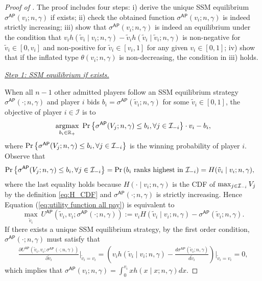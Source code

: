 \begin{proof}[{Proof of }]
The proof includes four steps: i) derive the unique SSM equilibrium $\sigma^{\mathsf{AP}}(v_i;n,\gamma)$ if exists; ii) check the obtained function $\sigma^{\mathsf{AP}}(v_i;n,\gamma)$ is indeed strictly increasing; iii) show that $\sigma^{\mathsf{AP}}(v_i;n,\gamma)$ is indeed an equilibrium under the condition that $v_i h(\tilde{v}_i\mid v_i;n,\gamma) - \tilde{v}_i h(\tilde{v}_i\mid \tilde{v}_i;n,\gamma)$ is non-negative for $\tilde{v}_i\in [0,v_i]$ and non-positive for $\tilde{v}_i\in [v_i,1]$ for any given $v_i\in [0,1]$; iv) show that if the inflated type
$\theta\left(v_i; n, \gamma\right)$ is non-decreasing, the condition in iii) holds.

 \medskip

\noindent\textit{\underline{Step 1: SSM equilibrium if exists.}}

 \medskip

\noindent When all $n-1$ other admitted players follow an SSM equilibrium strategy $\sigma^{\mathsf{AP}}(\cdot;n,\gamma)$ and player $i$ bids $ b_i =  \sigma^{\mathsf{AP}}(\tilde{v}_i;n,\gamma)$ for some $\tilde{v}_i\in[0,1]$, the objective of player $i \in \mathcal{I}$ is to
\begin{align}\label{eq:utility function all pay}
    \operatorname*{\text{argmax}}_{b_i\in \mathbb{R}_+}~  \Pr\left\{\sigma^{\mathsf{AP}}({V}_j;n,\gamma)\leq b_i,\forall j\in \mathcal{I}_{-i}\right\} \cdot v_i - b_i,
\end{align}
where $\Pr\left\{\sigma^{\mathsf{AP}}({V}_j;n,\gamma)\leq b_i,\forall j\in \mathcal{I}_{-i}\right\}$ is the winning probability of player $i$.  Observe that 
\begin{align*}
    \Pr\left\{\sigma^{\mathsf{AP}}({V}_j;n,\gamma)\leq b_i,\forall j\in \mathcal{I}_{-i}\right\} & = \Pr\left(\text{$b_i$ ranks  highest in $\mathcal{I}_{-i}$} \right) \nonumber = H(\tilde{v}_i\mid v_i;n,\gamma),
\end{align*}
where the last equality holds because $H(\cdot \mid v_i;n,\gamma)$ is the CDF of $\max_{j\in \mathcal{I}_{-i}}V_j$ by the definition \eqref{eq:H_CDF} and $\sigma^{\mathsf{AP}}(\cdot;n,\gamma)$ is strictly increasing. Hence Equation (\ref{eq:utility function all pay}) is equivalent to 
\begin{equation}
\label{eq:utility function all pay used}
\max_{\tilde{v}_i}~U^{\mathsf{AP}}(\tilde{v}_i,v_i;\sigma^{\mathsf{AP}}(\cdot;n,\gamma)):= v_i H(\tilde{v}_i\mid v_i; n,\gamma) - \sigma^{\mathsf{AP}}(\tilde{v}_i;n,\gamma).
\end{equation}
If there exists a unique SSM equilibrium strategy, by the first order condition, $\sigma^{\mathsf{AP}}(\cdot;n,\gamma)$ must satisfy that\
\begin{align*}
    \frac{\partial U^{\mathsf{AP}}(\tilde{v}_i,v_i;\sigma^{\mathsf{AP}}(\cdot;n,\gamma))}{\partial \tilde{v}_i}\bigg |_{\tilde{v}_i = v_i} = \left(v_ih(\tilde{v}_i\mid v_i; n,\gamma) - \frac{d \sigma^{\mathsf{AP}}(\tilde{v}_i;n,\gamma)}{d\tilde{v}_i}\right)\bigg |_{\tilde{v}_i = v_i} = 0,
\end{align*}
which implies that $\sigma^{\mathsf{AP}}(v_i;n,\gamma)
  =\int_0^{v_i} x h(x\mid x;n,\gamma)dx$.


\end{proof}
